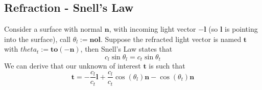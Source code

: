\documentclass[11pt]{article}
\newcommand{\bl}{\mathbf{l}}
\newcommand{\bn}{\mathbf{n}}
\newcommand{\bo}{\mathbf{o}}
\newcommand{\bt}{\mathbf{t}}
\begin{document}
\subsection{Refraction - Snell's Law}
Consider a surface with normal $\bn$, with incoming light vector $-\bl$ (so $\bl$ is pointing into the surface), call $\theta_l := \bn\bo\bl$. Suppose the refracted light vector is named $\bt$ with $theta_t:= \bt\bo (-\bn )$, then Snell's Law states that
\begin{equation}
	c_l \sin\theta_l = c_t \sin \theta_t
\end{equation}
We can derive that our unknown of interest $\bt$ is such that 
\begin{equation}
	\bt = -\frac{c_l}{c_t}\bl + \frac{c_l}{c_t} \cos(\theta_l) \bn - \cos (\theta_t ) \bn
\end{equation}
\end{document}
